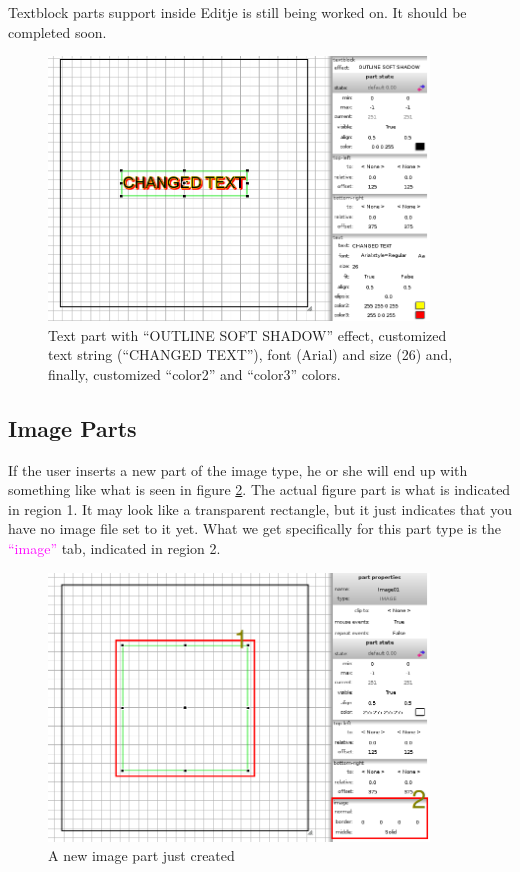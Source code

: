 \documentclass[a4paper]{profusion}
\newcommand{\GUILabel}[1]{\textcolor{magenta}{#1}}
\begin{document}
Textblock parts support inside Editje is still being worked on. It
should be completed soon.

\begin{figure}[h!]
  \centering
  \includegraphics[width=0.9\textwidth]{images/text_misc.png}
  \caption{Text part with ``OUTLINE SOFT SHADOW'' effect, customized
    text string (``CHANGED TEXT''), font (Arial) and size (26) and,
    finally, customized ``color2'' and ``color3'' colors.}
  \label{fig:text_misc}
\end{figure}

\subsection{Image Parts}

If the user inserts a new part of the image type, he or she will end
up with something like what is seen in figure \ref{fig:new_image}.
The actual figure part is what is indicated in region 1. It may look
like a transparent rectangle, but it just indicates that you have no
image file set to it yet. What we get specifically for this part type
is the \GUILabel{``image''} tab, indicated in region 2.

\begin{figure}[h!]
  \centering
  \includegraphics[width=0.9\textwidth]{images/new_image.png}
  \caption{A new image part just created}
  \label{fig:new_image}
\end{figure}
\end{document}
